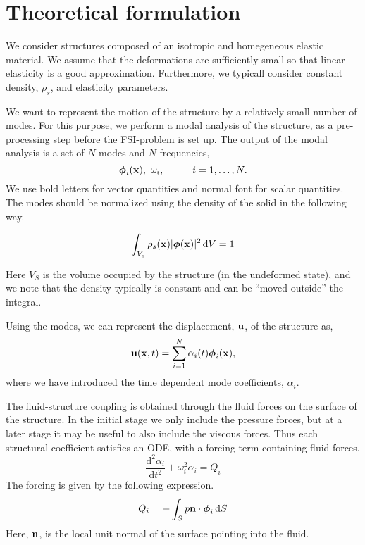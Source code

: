 \section{Theoretical formulation} \label{sec:theory}

We consider structures composed of an isotropic and homegeneous
elastic material. We assume that the deformations are sufficiently
small so that linear elasticity is a good approximation.
Furthermore, we typicall consider constant density, $\rho_s$,
and elasticity parameters.

We want to represent the motion of the structure by a relatively
small number of modes.
For this purpose, we perform a modal analysis of the structure, as a
pre-processing step before the FSI-problem is set up.
The output of the modal analysis is a set of $N$ modes and $N$ frequencies,
\[
\boldsymbol{\phi}_i(\mathbf{x}),\,\,\omega_i,\hspace{1cm} i=1,\ldots,N.
\]
We use bold letters for vector quantities and normal font for scalar
quantities. The modes should be normalized using the density
of the solid in the following way.

\begin{equation}
\int_{V_s} \rho_s(\mathbf{x}) |\boldsymbol{\phi}(\mathbf{x})|^2\,\mbox{d}V=1
\label{eq:volint}
\end{equation}

Here $V_S$ is the volume occupied by the structure (in the undeformed state),
and we note that the density typically is constant and can be ``moved
outside'' the integral.

Using the modes, we can represent the displacement, $\mathbf{u}$, of the structure as,
\[
\mathbf{u}(\mathbf{x},t)=\sum_{i=1}^N\alpha_i(t)\boldsymbol{\phi}_i(\mathbf{x}),
\]
where we have introduced the time dependent mode coefficients, $\alpha_i$.

The fluid-structure coupling is obtained through the fluid forces on
the surface of the structure. In the initial stage we only include the
pressure forces, but at a later stage it may be useful to also include
the viscous forces. Thus each structural coefficient satisfies an ODE,
with a forcing term containing fluid forces.
\[
\frac{\mbox{d}^2\alpha_i}{\mbox{d}t^2}+
\omega_i^2\alpha_i=Q_i
\]
The forcing is given by the following expression.
\[
Q_i=-\int_S p\mathbf{n}\cdot \boldsymbol{\phi}_i\,\mbox{d}S
\]
Here, $\mathbf{n}$, is the local  unit normal of the surface pointing into the fluid.

